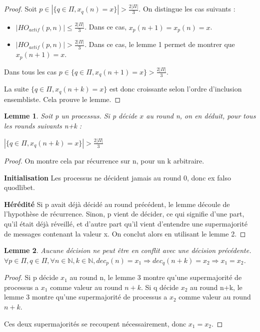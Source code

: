 \documentclass{article}
\newtheorem{lemma}{Lemme}
\begin{document}
\begin{proof}

Soit $p \in | \{ q \in \Pi , x_q(n) = x \} | > \frac{2|\Pi|}{3}$. On distingue les cas suivants :

\begin{itemize}

\item $|HO_{actif} (p, n) | \leq \frac{2|\Pi|}{3}$. Dans ce cas, $x_p(n+1) = x_p(n) = x$.
\item $|HO_{actif} (p, n) | > \frac{2|\Pi|}{3}$. Dans ce cas, le lemme 1 permet de montrer que $x_p(n+1) = x$.

\end{itemize}
Dans tous les cas 
$p \in \{ q \in \Pi , x_q(n+1) = x \} > \frac{2|\Pi|}{3}$.

La suite $\{ q \in \Pi , x_q(n+k) = x \}$ est donc croissante selon l'ordre d'inclusion ensembliste. Cela prouve le lemme.
\end{proof}
\begin{lemma}

Soit p un processus. Si p décide $x$ au round n, on en déduit, pour tous les rounds suivants n+k :

$| \{ q \in \Pi , x_q(n+k) = x \} | > \frac{2|\Pi|}{3}$
\end{lemma}
\begin{proof}

On montre cela par récurrence sur n, pour un k arbitraire.

\textbf{Initialisation}
Les processus ne décident jamais au round 0, donc ex falso quodlibet.

\textbf{Hérédité}
Si p avait déjà décidé au round précédent, le lemme découle de l'hypothèse de récurrence.
Sinon, p vient de décider, ce qui signifie d'une part, qu'il était déjà réveillé, et d'autre part
qu'il vient d'entendre une supermajorité de messages contenant la valeur x.
On conclut alors en utilisant le lemme 2.

\end{proof}
\begin{lemma}
	Aucune décision ne peut être en conflit avec une décision précédente.
	$\forall p \in \Pi, q \in \Pi, \forall n \in \mathds{N}, k \in \mathds{N}, dec_p(n) = x_1 \Rightarrow dec_q(n+k) = x_2 \Rightarrow x_1 = x_2$.
\end{lemma}
\begin{proof}

Si p décide $x_1$ au round n,   le lemme 3 montre qu'une supermajorité de processus a $x_1$ comme valeur au round $n+k$.
Si q décide $x_2$ au round n+k, le lemme 3 montre qu'une supermajorité de processus a $x_2$ comme valeur au round $n+k$.

Ces deux supermajorités se recoupent nécessairement, donc $x_1 = x_2$.
\end{proof}
\end{document}
